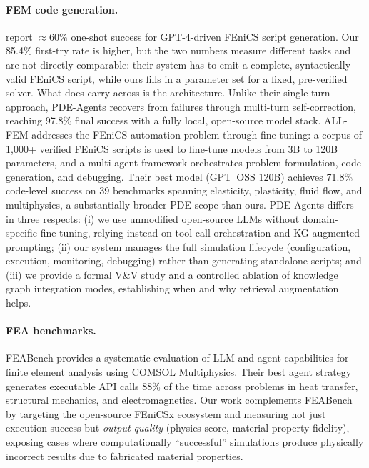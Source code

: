 \documentclass[twocolumn]{article}
\newif\ifrevisionsvisible
\newcommand{\revised}[1]{%
  \ifrevisionsvisible\textcolor{revisionred}{#1}\else#1\fi}
\begin{document}
\paragraph{FEM code generation.}
\citet{bauer2023llm} report $\approx 60\%$ one-shot success for
GPT-4-driven FEniCS script generation.  \revised{Our 85.4\% first-try rate is
higher, but the two numbers measure different tasks and are not directly
comparable: their system has to emit a complete, syntactically valid
FEniCS script, while ours fills in a parameter set for a fixed,
pre-verified solver.  What does carry across is the architecture.  Unlike}
their single-turn approach, PDE-Agents recovers from failures through
multi-turn self-correction, reaching 97.8\% final success with a fully
local, open-source model stack.
ALL-FEM \citep{deotale2026allfem} addresses the FEniCS automation problem
through fine-tuning: a corpus of 1{,}000+ verified FEniCS scripts is
used to fine-tune models from 3B to 120B parameters, and a multi-agent
framework orchestrates problem formulation, code generation, and
debugging.  Their best model (GPT~OSS 120B) achieves 71.8\% code-level
success on 39 benchmarks spanning elasticity, plasticity, fluid flow,
and multiphysics, a substantially broader PDE scope than ours.
PDE-Agents differs in three respects: (i) we use unmodified
open-source LLMs without domain-specific fine-tuning, relying instead
on tool-call orchestration and KG-augmented prompting;
(ii) our system manages the full simulation lifecycle (configuration,
execution, monitoring, debugging) rather than generating standalone
scripts; and (iii) we provide a formal V\&V study and a controlled
ablation of knowledge graph integration modes, establishing when and
why retrieval augmentation helps.

\paragraph{FEA benchmarks.}
FEABench \citep{mudur2025feabench} provides a systematic evaluation of
LLM and agent capabilities for finite element analysis using COMSOL
Multiphysics.  Their best agent strategy generates executable API calls
88\% of the time across problems in heat transfer, structural mechanics,
and electromagnetics.  Our work complements FEABench by targeting the
open-source FEniCSx ecosystem and measuring not just execution success
but \emph{output quality} (physics score, material property fidelity),
exposing cases where computationally ``successful'' simulations produce
physically incorrect results due to fabricated material properties.
\end{document}
